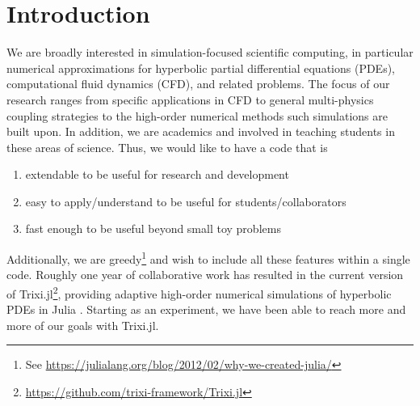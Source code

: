 \documentclass{juliacon}
\newcommand{\trixi}{Trixi.jl\xspace}
\begin{document}


\maketitle

\begin{abstract}
We present Trixi.jl, a Julia library for adaptive high-order numerical simulations
of hyperbolic partial differential equations (PDEs). Utilizing Julia's strengths,
Trixi.jl is extendable, easy to use, and fast. We describe the main design choices
that enable these features and compare Trixi.jl with an established open
source Fortran code for hyperbolic PDEs using the same numerical methods.
We conclude with an assessment of Julia for simulation-focused scientific
computing, an area that is still dominated by traditional high-performance
computing languages such as C, C++, and Fortran.
\end{abstract}


\section{Introduction}

We are broadly interested in simulation-focused scientific computing, in particular
numerical approximations for hyperbolic partial differential equations (PDEs), computational fluid dynamics (CFD),
and related problems. The focus of our research ranges from specific applications
in CFD to general multi-physics coupling strategies to the high-order numerical methods 
such simulations are built upon. In addition, we are academics and involved in teaching 
students in these areas of science. Thus, we would like to have a 
code that is
\begin{enumerate}
  \item extendable to be useful for research and development
  \item easy to apply/understand to be useful for students/collaborators
  \item fast enough to be useful beyond small toy problems
\end{enumerate}
Additionally, we are greedy\footnote{See \url{https://julialang.org/blog/2012/02/why-we-created-julia/}} 
and wish to include all these features within a single code.
Roughly one year of collaborative work has resulted in the current version of
\trixi\footnote{\url{https://github.com/trixi-framework/Trixi.jl}}, providing adaptive
high-order numerical simulations of hyperbolic PDEs
in Julia \cite{bezanson2017julia}. Starting as an experiment, we have been able
to reach more and more of our goals with \trixi.
\end{document}
